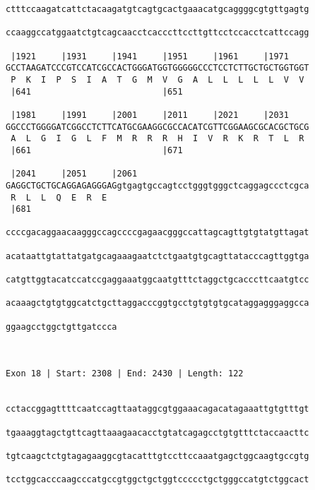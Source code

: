 \documentclass{article}
\begin{document}
\begin{Verbatim}
ctttccaagatcattctacaagatgtcagtgcactgaaacatgcaggggcgtgttgagtg
                                                            
ccaaggccatggaatctgtcagcaacctcacccttccttgttcctccacctcattccagg
                                                            
 |1921     |1931     |1941     |1951     |1961     |1971    
GCCTAAGATCCCGTCCATCGCCACTGGGATGGTGGGGGCCCTCCTCTTGCTGCTGGTGGT
 P  K  I  P  S  I  A  T  G  M  V  G  A  L  L  L  L  L  V  V 
 |641                          |651                         
  
 |1981     |1991     |2001     |2011     |2021     |2031    
GGCCCTGGGGATCGGCCTCTTCATGCGAAGGCGCCACATCGTTCGGAAGCGCACGCTGCG
 A  L  G  I  G  L  F  M  R  R  R  H  I  V  R  K  R  T  L  R 
 |661                          |671                         
  
 |2041     |2051     |2061                                  
GAGGCTGCTGCAGGAGAGGGAGgtgagtgccagtcctgggtgggctcaggagccctcgca
 R  L  L  Q  E  R  E                                        
 |681                                                       
  
ccccgacaggaacaagggccagccccgagaacgggccattagcagttgtgtatgttagat
                                                            
acataattgtattatgatgcagaaagaatctctgaatgtgcagttatacccagttggtga
                                                            
catgttggtacatccatccgaggaaatggcaatgtttctaggctgcacccttcaatgtcc
                                                            
acaaagctgtgtggcatctgcttaggacccggtgcctgtgtgtgcataggagggaggcca
                                                            
ggaagcctggctgttgatccca
                      
                      
 
Exon 18 | Start: 2308 | End: 2430 | Length: 122


cctaccggagttttcaatccagttaataggcgtggaaacagacatagaaattgtgtttgt
                                                            
tgaaaggtagctgttcagttaaagaacacctgtatcagagcctgtgtttctaccaacttc
                                                            
tgtcaagctctgtagagaaggcgtacatttgtccttccaaatgagctggcaagtgccgtg
                                                            
tcctggcacccaagcccatgccgtggctgctggtccccctgctgggccatgtctggcact
                                                            

\end{Verbatim}
\end{document}
